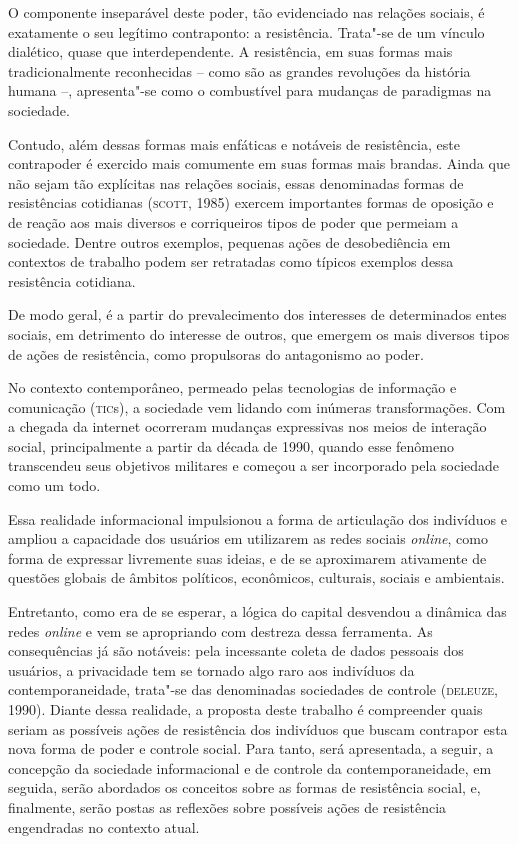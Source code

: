 O componente inseparável deste poder, tão evidenciado nas relações
sociais, é exatamente o seu legítimo contraponto: a resistência.
Trata"-se de um vínculo dialético, quase que interdependente. A
resistência, em suas formas mais tradicionalmente reconhecidas -- como
são as grandes revoluções da história humana --, apresenta"-se como o
combustível para mudanças de paradigmas na sociedade.

Contudo, além dessas formas mais enfáticas e notáveis de resistência,
este contrapoder é exercido mais comumente em suas formas mais brandas.
Ainda que não sejam tão explícitas nas relações sociais, essas
denominadas formas de resistências cotidianas (\textsc{scott}, 1985) exercem
importantes formas de oposição e de reação aos mais diversos e
corriqueiros tipos de poder que permeiam a sociedade. Dentre outros
exemplos, pequenas ações de desobediência em contextos de trabalho podem
ser retratadas como típicos exemplos dessa resistência cotidiana.

De modo geral, é a partir do prevalecimento dos interesses de
determinados entes sociais, em detrimento do interesse de outros, que
emergem os mais diversos tipos de ações de resistência, como propulsoras
do antagonismo ao poder.

No contexto contemporâneo, permeado pelas tecnologias de informação e
comunicação (\textsc{tic}s), a sociedade vem lidando com inúmeras transformações.
Com a chegada da internet ocorreram mudanças expressivas nos meios de
interação social, principalmente a partir da década de 1990, quando esse
fenômeno transcendeu seus objetivos militares e começou a ser
incorporado pela sociedade como um todo.

Essa realidade informacional impulsionou a forma de articulação dos
indivíduos e ampliou a capacidade dos usuários em utilizarem as redes
sociais \emph{online}, como forma de expressar livremente suas ideias, e de se
aproximarem ativamente de questões globais de âmbitos políticos,
econômicos, culturais, sociais e ambientais.

Entretanto, como era de se esperar, a lógica do capital desvendou a
dinâmica das redes \emph{online} e vem se apropriando com destreza dessa
ferramenta. As consequências já são notáveis: pela incessante coleta de
dados pessoais dos usuários, a privacidade tem se tornado algo raro aos
indivíduos da contemporaneidade, trata"-se das denominadas sociedades de
controle (\textsc{deleuze}, 1990). Diante dessa realidade, a proposta deste
trabalho é compreender quais seriam as possíveis ações de resistência
dos indivíduos que buscam contrapor esta nova forma de poder e controle
social. Para tanto, será apresentada, a seguir, a concepção da sociedade
informacional e de controle da contemporaneidade, em seguida, serão
abordados os conceitos sobre as formas de resistência social, e,
finalmente, serão postas as reflexões sobre possíveis ações de
resistência engendradas no contexto atual.

